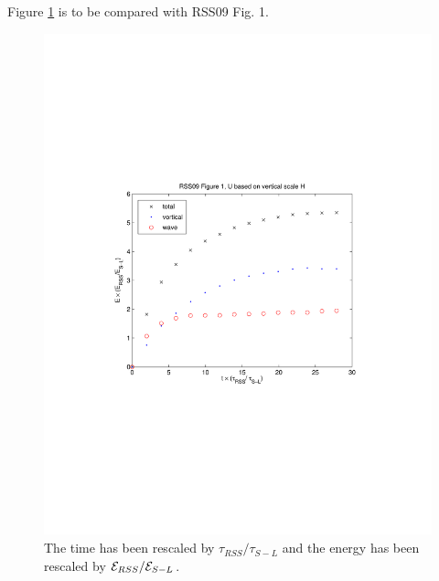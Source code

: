 \documentclass[12pt]{article}
\begin{document}
Figure \ref{Fig1_H} is to be compared with RSS09 Fig. 1. 
\begin{figure}[ht]
\centering
\includegraphics[scale = .7]{RSS09_Fig1_UH}
\caption{The time has been rescaled by $\tau_{RSS}/\tau_{S-L}$ and the energy has been rescaled by ${\cal E}_{RSS}/{\cal E}_{S-L}$. \label{Fig1_H}}
\end{figure}
\end{document}
